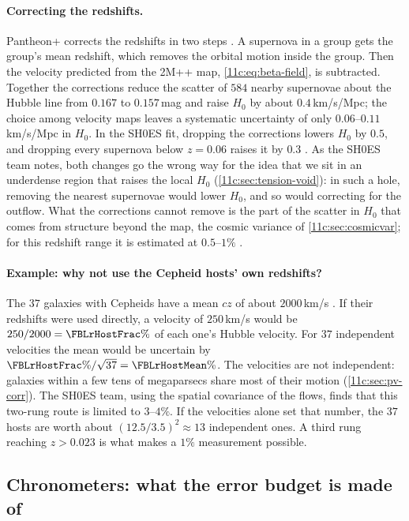 \paragraph{Correcting the redshifts.} Pantheon+ corrects the redshifts in two steps
\cite{Peterson2022}. A supernova in a group gets the group's mean redshift, which
removes the orbital motion inside the group. Then the velocity predicted from the
2M++ map, \eqref{11c:eq:beta-field}, is subtracted. Together the corrections reduce
the scatter of $584$ nearby supernovae about the Hubble line from $0.167$ to
$0.157$\,mag and raise $H_0$ by about $0.4$\,km/s/Mpc; the choice among velocity maps
leaves a systematic uncertainty of only $0.06$--$0.11$\,km/s/Mpc in $H_0$. In the SH0ES fit, dropping the corrections
lowers $H_0$ by $0.5$, and dropping every supernova below $z=0.06$ raises it by $0.3$
\cite[Secs.~6.8, 6.12]{Riess2022SH0ES}. As the SH0ES team notes, both changes go the
wrong way for the idea that we sit in an underdense region that raises the local $H_0$
(\cref{11c:sec:tension-void}): in such a hole, removing the nearest supernovae would
lower $H_0$, and so would correcting for the outflow. What the corrections cannot
remove is the part of the scatter in $H_0$ that comes from structure beyond the map, the
cosmic variance of \cref{11c:sec:cosmicvar}; for this redshift range it is estimated
at $0.5$--$1\%$ \cite[Sec.~IV.F]{Abdalla2022}.

\paragraph{Example: why not use the Cepheid hosts' own redshifts?} The $37$ galaxies
with Cepheids have a mean $cz$ of about $2000$\,km/s \cite[Sec.~6.12]{Riess2022SH0ES}. If
their redshifts were used directly, a velocity of $250$\,km/s would be
$250/2000=\FBLrHostFrac\%$ of each one's Hubble velocity. For $37$ independent
velocities the mean would be uncertain by $\FBLrHostFrac\%/\sqrt{37}=\FBLrHostMean\%$.
The velocities are not independent: galaxies within a few tens of megaparsecs share
most of their motion (\cref{11c:sec:pv-corr}). The SH0ES team, using the spatial
covariance of the flows, finds that this two-rung route is limited to $3$--$4\%$. If
the velocities alone set that number, the $37$ hosts are worth about
$(12.5/3.5)^2\approx13$ independent ones. A third rung reaching $z>0.023$ is what
makes a $1\%$ measurement possible.

\subsection{Chronometers: what the error budget is made of}
\label{11c:sec:research-cc}

